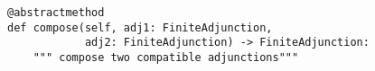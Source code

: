 \begin{verbatim}
@abstractmethod
def compose(self, adj1: FiniteAdjunction,
            adj2: FiniteAdjunction) -> FiniteAdjunction:
    """ compose two compatible adjunctions"""
\end{verbatim}
